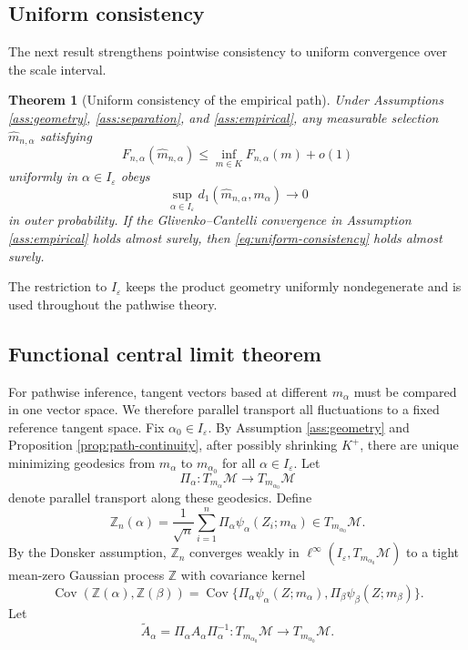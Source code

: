 \documentclass[11pt]{article}
\newtheorem{theorem}{Theorem}
\DeclareMathOperator{\Cov}{Cov}
\newcommand{\M}{\mathcal M}
\newcommand{\eps}{\varepsilon}
\newcommand{\1}{\mathbf{1}}
\begin{document}
\subsection{Uniform consistency}

The next result strengthens pointwise consistency to uniform convergence over
the scale interval.

\begin{theorem}[Uniform consistency of the empirical path]\label{thm:uniform-consistency}
Under Assumptions \ref{ass:geometry}, \ref{ass:separation}, and \ref{ass:empirical}, any measurable selection $\widehat m_{n,\alpha}$ satisfying
\[
 F_{n,\alpha}(\widehat m_{n,\alpha})
 \le
 \inf_{m\in K}F_{n,\alpha}(m)+o(1)
\]
uniformly in $\alpha\in I_\eps$ obeys
\begin{equation}\label{eq:uniform-consistency}
 \sup_{\alpha\in I_\eps}d_1(\widehat m_{n,\alpha},m_\alpha)\to0
\end{equation}
in outer probability.  If the Glivenko--Cantelli convergence in Assumption \ref{ass:empirical} holds almost surely, then \eqref{eq:uniform-consistency} holds almost surely.
\end{theorem}

The restriction to $I_\eps$ keeps the product geometry uniformly nondegenerate
and is used throughout the pathwise theory.

\subsection{Functional central limit theorem}

For pathwise inference, tangent vectors based at different $m_\alpha$ must be
compared in one vector space.  We therefore parallel transport all fluctuations
to a fixed reference tangent space.  Fix $\alpha_0\in I_\eps$.  By Assumption
\ref{ass:geometry} and Proposition \ref{prop:path-continuity}, after possibly
shrinking $K^+$, there are unique minimizing geodesics from $m_\alpha$ to
$m_{\alpha_0}$ for all $\alpha\in I_\eps$. Let
\[
 \Pi_\alpha:T_{m_\alpha}\M\to T_{m_{\alpha_0}}\M
\]
denote parallel transport along these geodesics.  Define
\[
 \mathbb Z_n(\alpha)
 =\frac1{\sqrt n}\sum_{i=1}^n
 \Pi_\alpha\psi_\alpha(Z_i;m_\alpha)
 \in T_{m_{\alpha_0}}\M.
\]
By the Donsker assumption, $\mathbb Z_n$ converges weakly in $\ell^\infty(I_\eps,T_{m_{\alpha_0}}\M)$ to a tight mean-zero Gaussian process $\mathbb Z$ with covariance kernel
\begin{equation}\label{eq:Z-cov-kernel}
 \Cov(\mathbb Z(\alpha),\mathbb Z(\beta))
 =
 \Cov\{\Pi_\alpha\psi_\alpha(Z;m_\alpha),
       \Pi_\beta\psi_\beta(Z;m_\beta)\}.
\end{equation}
Let
\[
 \widetilde A_\alpha= \Pi_\alpha A_\alpha\Pi_\alpha^{-1}
 :T_{m_{\alpha_0}}\M\to T_{m_{\alpha_0}}\M.
\]
\end{document}
